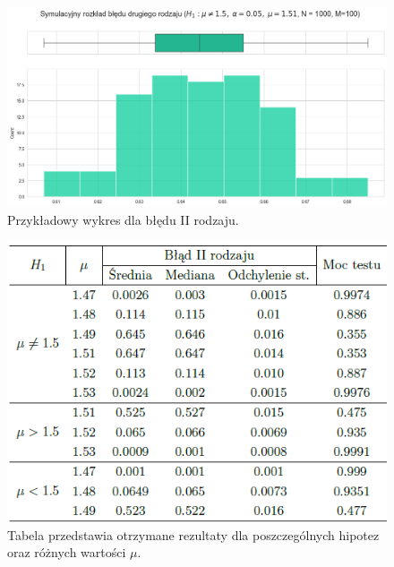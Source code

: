 \documentclass{article}
\begin{document}
\begin{figure}[H]
    \centering
    \includegraphics[scale=0.42]{mu151.png}
    \caption{Przykładowy wykres dla błędu II rodzaju.}
    \label{fig:6}
\end{figure}
\begin{figure}[H]
    \centering
    \includegraphics[scale=0.65]{tabelka_srednia2.png}
    \caption{Tabela przedstawia otrzymane rezultaty dla poszczególnych hipotez oraz różnych wartości $\mu$.}
    \label{fig:6}
\end{figure}
\end{document}
